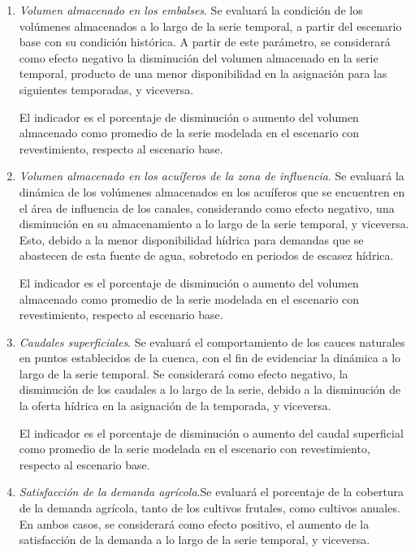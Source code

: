 \documentclass[]{article}
\begin{document}
\begin{enumerate}

\item \textit{Volumen almacenado en los embalses}. Se evaluará la condición de los volúmenes almacenados a lo largo de la serie temporal, a partir del escenario base con su condición histórica. A partir de este parámetro, se considerará como efecto negativo la disminución del volumen almacenado en la serie temporal, producto de una menor disponibilidad en la asignación para las siguientes temporadas, y viceversa.

El indicador es el porcentaje de disminución o aumento del volumen almacenado 	como promedio de la serie modelada en el escenario con revestimiento, respecto 	al escenario base.


\item \textit{Volumen almacenado en los acuíferos de la zona de influencia}. Se evaluará la dinámica de los volúmenes almacenados en los acuíferos que se encuentren en el área de influencia de los canales, considerando como efecto negativo, una disminución en su almacenamiento a lo largo de la serie temporal, y viceversa. Esto, debido a la menor disponibilidad hídrica para demandas que se abastecen de esta fuente de agua, sobretodo en periodos de escasez hídrica.

El indicador es el porcentaje de disminución o aumento del volumen almacenado 	como promedio de la serie modelada en el escenario con revestimiento, respecto 	al escenario base.

\item \textit{Caudales superficiales}. Se evaluará el comportamiento de los cauces naturales en puntos establecidos de la cuenca, con el fin de evidenciar la dinámica a lo largo de la serie temporal. Se considerará como efecto negativo, la disminución de los caudales a lo largo de la serie, debido a la disminución de la oferta hídrica en la asignación de la temporada, y viceversa.
	
El indicador es el porcentaje de disminución o aumento del caudal superficial como promedio de la serie modelada en el escenario con revestimiento, respecto al escenario base.


\item \textit{Satisfacción de la demanda agrícola}.Se evaluará el porcentaje de la cobertura de la demanda agrícola, tanto de los cultivos frutales, como cultivos anuales. En ambos casos, se considerará como efecto positivo, el aumento de la satisfacción de la demanda a lo largo de la serie temporal, y viceversa.


\end{enumerate}
\end{document}
